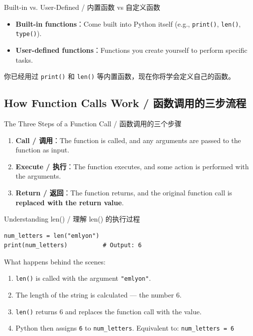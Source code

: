 \documentclass[11pt,a4paper]{report}
\let\oldtexttt\texttt
\renewcommand{\texttt}[1]{\textcolor{mainblue}{\oldtexttt{#1}}}
\begin{document}
\begin{concept}{Built-in vs. User-Defined / 内置函数 vs 自定义函数}
    \begin{itemize}[itemsep=0.3em]
        \item \textbf{Built-in functions}：Come built into Python itself (e.g., \texttt{print()}, \texttt{len()}, \texttt{type()}).
        \item \textbf{User-defined functions}：Functions you create yourself to perform specific tasks.
    \end{itemize}
    你已经用过 \texttt{print()} 和 \texttt{len()} 等内置函数，现在你将学会定义自己的函数。
\end{concept}

\subsection{How Function Calls Work / 函数调用的三步流程}

\begin{concept}{The Three Steps of a Function Call / 函数调用的三个步骤}
    \begin{enumerate}[itemsep=0.5em]
        \item \textbf{Call / 调用}：The function is called, and any arguments are passed to the function as input.
        \item \textbf{Execute / 执行}：The function executes, and some action is performed with the arguments.
        \item \textbf{Return / 返回}：The function returns, and the original function call is \textbf{replaced with the return value}.
    \end{enumerate}
\end{concept}

\begin{examplebox}{Understanding len() / 理解 len() 的执行过程}
\begin{lstlisting}
num_letters = len("emlyon")
print(num_letters)          # Output: 6
\end{lstlisting}
    What happens behind the scenes:
    \begin{enumerate}
        \item \texttt{len()} is called with the argument \texttt{"emlyon"}.
        \item The length of the string is calculated — the number 6.
        \item \texttt{len()} returns 6 and replaces the function call with the value.
        \item Python then assigns \texttt{6} to \texttt{num\_letters}. Equivalent to: \texttt{num\_letters = 6}
    \end{enumerate}
\end{examplebox}
\end{document}

